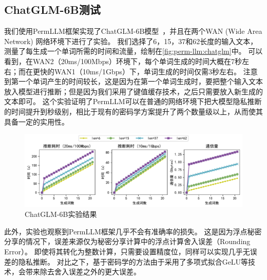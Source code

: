 \subsection{ChatGLM-6B测试}
我们使用PermLLM框架实现了ChatGLM-6B模型~\cite{zeng_2022_glm130b}，并且在两个WAN (Wide Area Network) 网络环境下进行了实验。
%
我们选择了6，15，37和62长度的输入文本，测量了每生成一个单词所需的时间和流量，绘制在\autoref{fig:perm-llm:chatglm}中。
%
可以看到，在WAN2（20ms/100Mbps）环境下，每个单词生成的时间大概在7秒左右；而在更快的WAN1（10ms/1Gbps）下，单词生成的时间仅需3秒左右。
%
注意到第一个单词产生的时间较长，这是因为在第一个单词生成时，要把整个输入文本放入模型进行推断；但是因为我们采用了键值缓存技术，之后只需要放入新生成的文本即可。
%
这个实验证明了PermLLM可以在普通的网络环境下把大模型隐私推断的时间提升到秒级别，相比于现有的密码学方案提升了两个数量级以上，从而使其具备一定的实用性。
%

\begin{figure}[htbp]
    \centering
    \includegraphics[width=\linewidth]{Z_Resources/perm-llm_ChatGLM.pdf}
    \caption{ChatGLM-6B实验结果}
    \label{fig:perm-llm:chatglm}
\end{figure}


此外，实验也观察到PermLLM框架几乎不会有准确率的损失。
%
这是因为浮点秘密分享的情况下，误差来源仅为秘密分享计算中的浮点计算舍入误差（Rounding Error）。
%
即使将其转化为整数计算，只需要设置精度位，同样可以实现几乎无误差的隐私推断。
%
对比之下，基于密码学的方法由于采用了多项式拟合GeLU等技术，会带来除去舍入误差之外的更大误差。